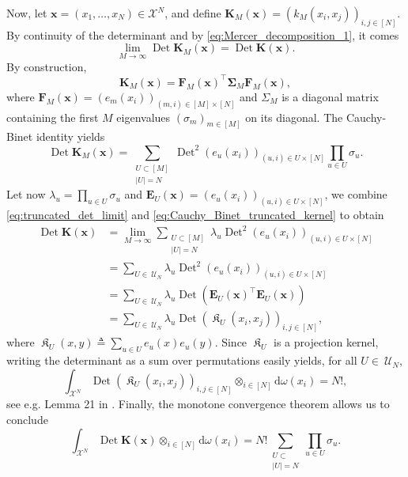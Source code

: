 \documentclass[twoside,11pt]{book}
\numberwithin{theorem}{chapter}
\numberwithin{definition}{chapter}
\numberwithin{proposition}{chapter}
\numberwithin{corollary}{chapter}
\numberwithin{example}{chapter}
\numberwithin{lemma}{chapter}
\DeclareMathOperator{\Det}{Det}
\DeclareMathOperator{\Tran}{\intercal}
\DeclareMathOperator*{\KDPP}{\mathfrak{K}}
\DeclareMathOperator{\X}{\mathcal{X}}
\DeclareMathOperator{\Ns}{\mathbb{N}^{*}}
\def\UN{\:\mathcal{U}_N}
\begin{document}
Now, let $\bm{x} = (x_{1}, \dots, x_{N}) \in \mathcal{X}^{N}$, and define
$\bm{K}_{M}(\bm{x}) = (k_{M}(x_{i},x_{j}))_{i,j \in [N]}$. By continuity of the determinant and by \eqref{eq:Mercer_decomposition_1}, it comes
\begin{equation}\label{eq:truncated_det_limit}
  \lim\limits_{M \rightarrow \infty} \Det \bm{K}_{M}(\bm{x}) = \Det \bm{K}(\bm{x}).
\end{equation}
By construction,
\begin{equation}
  \bm{K}_{M}(\bm{x}) = \bm{F}_{M}(\bm{x})^{\Tran}\bm{\Sigma}_{M}\bm{F}_{M}(\bm{x}),
\end{equation}
where $\bm{F}_{M}(\bm{x}) = (e_{m}(x_{i}))_{(m,i) \in [M]\times[N]}$ and $\Sigma_{M}$ is a diagonal matrix containing the first $M$ eigenvalues $(\sigma_{m})_{m\in[M]}$ on its diagonal. The Cauchy-Binet identity yields
\begin{equation}\label{eq:Cauchy_Binet_truncated_kernel}
  \Det \bm{K}_{M}(\bm{x})  = \sum\limits_{\substack{U \subset [M]\\ |U| = N}} \Det^{2} (e_{u}(x_{i}))_{(u,i)\in U \times [N]} \prod\limits_{u \in U} \sigma_{u}.
\end{equation}
Let now $\lambda_u= \prod_{u \in U} \sigma_{u}$ and $\bm{E}_{U}(\bm{x}) = (e_{u}(x_{i}))_{(u,i)\in U \times [N]}$,
we combine \eqref{eq:truncated_det_limit} and \eqref{eq:Cauchy_Binet_truncated_kernel} to obtain
\begin{align}
\Det \bm{K}(\bm{x}) & = \lim\limits_{M \rightarrow \infty} \sum_{\substack{U \subset [M]\\ |U| = N}} \lambda_u \Det^{2} (e_{u}(x_{i}))_{(u,i)\in U \times [N]}  \\
&= \sum_{U\in \UN} \lambda_u \Det^{2} (e_{u}(x_{i}))_{(u,i)\in U \times [N]}\\
&= \sum_{U\in \UN} \lambda_u \Det \left( \bm{E}_{U}(\bm{x})^{\Tran} \bm{E}_{U}(\bm{x}) \right)\\
&= \sum_{U\in \UN} \lambda_u \Det ({\KDPP}_{U}(x_{i},x_{j}))_{i,j \in [N]},
\end{align}
where ${\KDPP}_{U}(x,y) \triangleq \sum_{u\in U} e_u(x)e_u(y)$. Since ${\KDPP}_{U}$ is a projection kernel, writing the determinant as a sum over permutations easily yields, for all $U\in\UN$,
\begin{equation}
\int_{\X^{N}} \Det({\KDPP}_{U}(x_{i},x_{j}))_{i,j \in [N]} \otimes_{i \in [N]} \mathrm{d}\omega(x_{i}) = N!,
\end{equation}
see e.g. Lemma 21 in \citep{HoKrPeVi06}. Finally, the monotone convergence theorem allows us to conclude
\begin{equation}
\int_{\X^{N}} \Det \bm{K}(\bm{x}) \otimes_{i \in [N]} \mathrm{d}\omega(x_{i}) = N! \sum\limits_{\substack{U \subset \Ns\\ |U| = N}} \prod\limits_{u \in U } \sigma_{u}.
\end{equation}
\end{document}
